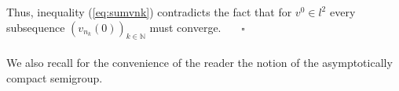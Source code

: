 \documentclass[preprintnumbers,amsmath,amssymb]{revtex4}
\begin{document}
 Thus, inequality (\ref{eq:sumvnk}) contradicts the fact that for $v^0 \in l^2$  every subsequence $(v_{n_k}(0))_{k\in {\mathbb{N}}}$ must  converge. \ \ \ $\square$
%
\\
\\
%
We also recall for the convenience of the reader the notion of the asymptotically compact semigroup.
% 
% 
% 
\end{document}

